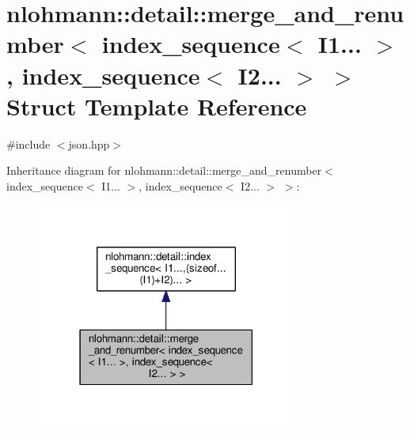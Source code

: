 \hypertarget{structnlohmann_1_1detail_1_1merge__and__renumber_3_01index__sequence_3_01_i1_8_8_8_01_4_00_01indf5ec8c9c7b5107e4b381e3ca4c1be2ca}{}\section{nlohmann\+:\+:detail\+:\+:merge\+\_\+and\+\_\+renumber$<$ index\+\_\+sequence$<$ I1... $>$, index\+\_\+sequence$<$ I2... $>$ $>$ Struct Template Reference}
\label{structnlohmann_1_1detail_1_1merge__and__renumber_3_01index__sequence_3_01_i1_8_8_8_01_4_00_01indf5ec8c9c7b5107e4b381e3ca4c1be2ca}


{\ttfamily \#include $<$json.\+hpp$>$}



Inheritance diagram for nlohmann\+:\+:detail\+:\+:merge\+\_\+and\+\_\+renumber$<$ index\+\_\+sequence$<$ I1... $>$, index\+\_\+sequence$<$ I2... $>$ $>$\+:\nopagebreak
\begin{figure}[H]
\begin{center}
\leavevmode
\includegraphics[width=243pt]{structnlohmann_1_1detail_1_1merge__and__renumber_3_01index__sequence_3_01_i1_8_8_8_01_4_00_01ind6c27662b24eb9b5dea448f2c0400428a}
\end{center}
\end{figure}


